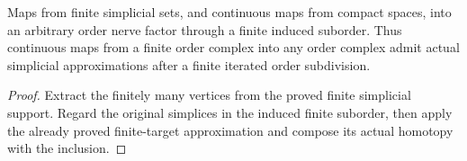 \begin{proposition}
  \label{prop:actual-arbitrary-order-target-approximation}
  \leanok
  Maps from finite simplicial sets, and continuous maps from compact spaces, into an arbitrary order nerve factor through a finite induced suborder. Thus continuous maps from a finite order complex into any order complex admit actual simplicial approximations after a finite iterated order subdivision.
\end{proposition}
\begin{proof}
  Extract the finitely many vertices from the proved finite simplicial support. Regard the original simplices in the induced finite suborder, then apply the already proved finite-target approximation and compose its actual homotopy with the inclusion.
  \leanok
\end{proof}

